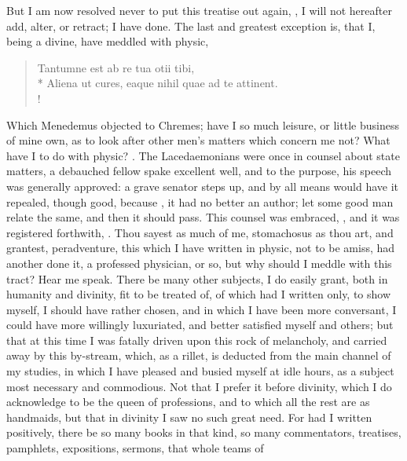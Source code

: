 But I am now resolved never to put this treatise out again, ,
I will not hereafter add, alter, or retract; I have done. The last and greatest
exception is, that I, being a divine, have meddled with physic,

\begin{latin}
\begin{verse}%
Tantumne est ab re tua otii tibi,\\*
Aliena ut cures, eaque nihil quae ad te attinent.\\!
\end{verse}%
\end{latin}
%

Which Menedemus objected to Chremes; have I so much leisure, or little business
of mine own, as to look after other men's matters which concern me not? What
have I to do with physic? . The
Lacedaemonians were once in counsel about state matters, a
debauched fellow spake excellent well, and to the purpose, his speech was
generally approved: a grave senator steps up, and by all means would have it
repealed, though good, because , it had no
better an author; let some good man relate the same, and then it should pass.
This counsel was embraced, , and it was registered forthwith,
. Thou sayest as
much of me, stomachosus as thou art, and grantest, peradventure, this which I
have written in physic, not to be amiss, had another done it, a professed
physician, or so, but why should I meddle with this tract? Hear me speak. There
be many other subjects, I do easily grant, both in humanity and divinity, fit
to be treated of, of which had I written  only, to show
myself, I should have rather chosen, and in which I have been more conversant,
I could have more willingly luxuriated, and better satisfied myself and others;
but that at this time I was fatally driven upon this rock of melancholy, and
carried away by this by-stream, which, as a rillet, is deducted from the main
channel of my studies, in which I have pleased and busied myself at idle hours,
as a subject most necessary and commodious. Not that I prefer it before
divinity, which I do acknowledge to be the queen of professions, and to which
all the rest are as handmaids, but that in divinity I saw no such great need.
For had I written positively, there be so many books in that kind, so many
commentators, treatises, pamphlets, expositions, sermons, that whole teams of

